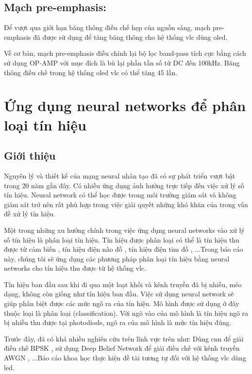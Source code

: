 \subsection{Mạch pre-emphasis: \cite{pre-emphasis}}

Để vượt qua giới hạn băng thông điều chế hẹp của nguồn sáng, mạch pre-emphasis đã được sử dụng để tăng băng thông cho hệ thống \ac{vlc} dùng \ac{oled}. 

Về cơ bản, mạch pre-emphasis điều chỉnh lại bộ lọc band-pass tích cực bằng cách sử dụng OP-AMP với mục đích là bù lại phần tần số từ DC đến 100kHz. Băng thông điều chế trong hệ thống \ac{oled} \ac{vlc} có thể tăng 45 lần.
 
\section{Ứng dụng neural networks để phân loại tín hiệu}
\subsection{Giới thiệu}
Nguyên lý và thiết kế của mạng neural nhân tạo đã có sự phát triển vượt bật trong 20 năm gần đây. Có nhiều ứng dụng ảnh hưởng trực tiếp đến việc xử lý số tín hiệu. Neural network có thể học được trong môi trường giám sát và không giám sát trở nên rất phù hợp trong việc giải quyết những khó khăn của trong vấn đề xử lý tín hiệu. \cite{NN-DSP}

Một trong những xu hướng chính trong việc ứng dụng neural networks vào xử lý số tín hiệu là phân loại tín hiệu. Tín hiệu được phân loại có thể là tín hiệu thu được từ cảm biến \cite{8940077}, tín hiệu điện não đồ \cite{eeg}, tín hiệu điện tim đồ \cite{ecg}, ...Trong báo cáo này, chúng tôi sẽ ứng dụng các phương pháp phân loại tín hiệu bằng neural networks cho tín hiệu thu được từ hệ thống \ac{vlc}.

Tín hiệu ban đầu sau khi đi qua một loạt khối và kênh truyền đã bị nhiễu, méo dạng, không còn giống như tín hiệu ban đầu. Việc sử dụng neural network sẽ giúp phân biệt được các mức ngõ ra của tín hiệu. Mô hình được sử dụng ở đây thuộc loại là phân loại (classification). Với ngõ vào của mô hình là tín hiệu ngõ ra bị nhiễu thu được tại photodiode, ngõ ra của mô hình là mức tín hiệu đúng.

Trước đây, đã có khá nhiều nghiên cứu trên lĩnh vực trên như: Dùng \ac{cnn} để giải điều chế BPSK \cite{cnn-bpsk}, sử dụng Deep Belief Network để giải điều chế với kênh truyền AWGN \cite{dcnn}, ...Báo cáo khoa học \cite{demod-with-ML} thực hiện đề tài tương tự đối với hệ thống \ac{vlc} dùng \ac{led}.


